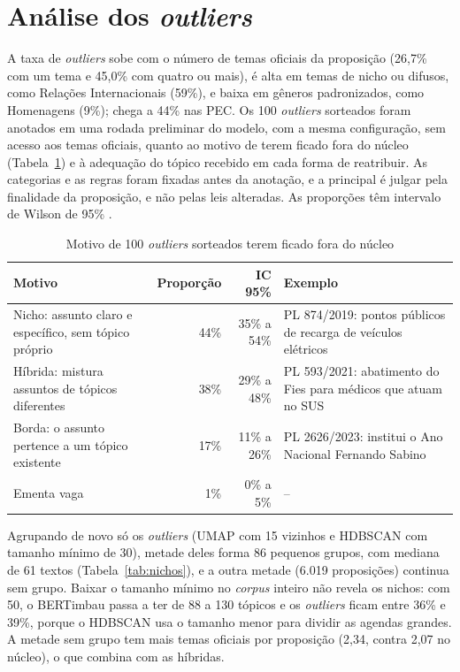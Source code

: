 \documentclass[12pt]{article}
\newcommand{\tabfont}{\fontsize{9}{11}\selectfont\setlength{\tabcolsep}{2.5pt}}
\begin{document}
\clearpage
\section{Análise dos \textit{outliers}}
\label{app:outliers}

A taxa de \textit{outliers} sobe com o número de temas oficiais da proposição (26,7\% com um tema e 45,0\% com quatro ou mais), é alta em temas de nicho ou difusos, como Relações Internacionais (59\%), e baixa em gêneros padronizados, como Homenagens (9\%); chega a 44\% nas PEC. Os 100 \textit{outliers} sorteados foram anotados em uma rodada preliminar do modelo, com a mesma configuração, sem acesso aos temas oficiais, quanto ao motivo de terem ficado fora do núcleo (Tabela~\ref{tab:anotacao}) e à adequação do tópico recebido em cada forma de reatribuir. As categorias e as regras foram fixadas antes da anotação, e a principal é julgar pela finalidade da proposição, e não pelas leis alteradas. As proporções têm intervalo de Wilson de 95\% \citep{wilson1927probable}.

\begin{table}[H]
\centering
\caption{Motivo de 100 \textit{outliers} sorteados terem ficado fora do núcleo}
\label{tab:anotacao}
\tabfont
\begin{tabularx}{\textwidth}{>{\raggedright\arraybackslash}p{4.4cm} r r >{\raggedright\arraybackslash}X}
\toprule
\textbf{Motivo} & \textbf{Proporção} & \textbf{IC 95\%} & \textbf{Exemplo} \\
\midrule
Nicho: assunto claro e específico, sem tópico próprio & 44\% & 35\% a 54\% & PL 874/2019: pontos públicos de recarga de veículos elétricos \\
Híbrida: mistura assuntos de tópicos diferentes & 38\% & 29\% a 48\% & PL 593/2021: abatimento do Fies para médicos que atuam no SUS \\
Borda: o assunto pertence a um tópico existente & 17\% & 11\% a 26\% & PL 2626/2023: institui o Ano Nacional Fernando Sabino \\
Ementa vaga & 1\% & 0\% a 5\% & -- \\
\bottomrule
\end{tabularx}
\end{table}

Agrupando de novo só os \textit{outliers} (UMAP com 15 vizinhos e HDBSCAN com tamanho mínimo de 30), metade deles forma 86 pequenos grupos, com mediana de 61 textos (Tabela~\ref{tab:nichos}), e a outra metade (6.019 proposições) continua sem grupo. Baixar o tamanho mínimo no \textit{corpus} inteiro não revela os nichos: com 50, o BERTimbau passa a ter de 88 a 130 tópicos e os \textit{outliers} ficam entre 36\% e 39\%, porque o HDBSCAN usa o tamanho menor para dividir as agendas grandes. A metade sem grupo tem mais temas oficiais por proposição (2,34, contra 2,07 no núcleo), o que combina com as híbridas.
\end{document}
